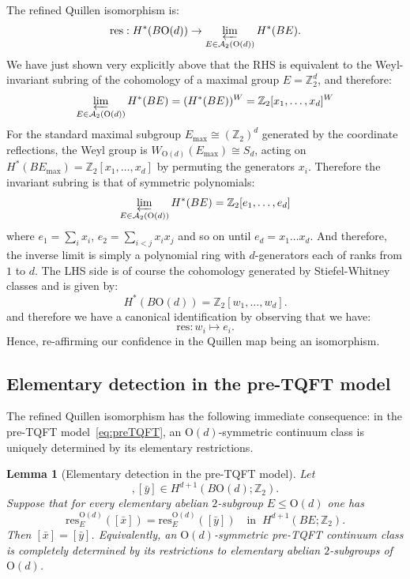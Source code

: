 \documentclass[aps,prx,reprint,superscriptaddress,twocolumn,amsmath,amssymb,amsfonts, nofootinbib]{revtex4-2}
\newcommand{\res}{\text{res}}
\theoremstyle{apsstyle}
\newtheorem{lemma}{Lemma}
\begin{document}
\noindent The refined Quillen isomorphism is: 
\begin{equation*}
\res: H^{*}(B\mathrm{O}(d)) \to \varprojlim_{E\in \mathcal{A}_{2}(\mathrm{O}(d))} H^{*}(BE).
\end{equation*}
We have just shown very explicitly above that the RHS is equivalent to the Weyl-invariant subring of the cohomology of a maximal group $E=\mathbb{Z}_{2}^{d}$, and therefore: 
\begin{equation*}
\varprojlim_{E\in \mathcal{A}_{2}(\mathrm{O}(d))} H^{*}(BE) = (H^{*}(BE))^{W} = \mathbb{Z}_{2}[x_{1},\dots, x_{d}]^{W}
\end{equation*}
For the standard maximal subgroup $E_{\mathrm{max}}\cong(\mathbb Z_2)^d$ generated by the coordinate reflections, the Weyl group is $W_{\mathrm O(d)}(E_{\mathrm{max}})\cong S_d$, acting on $H^*(BE_{\mathrm{max}}) =\mathbb Z_2[x_1,\ldots,x_d]$ by permuting the generators $x_i$. Therefore the invariant subring is that of symmetric polynomials: $$
\varprojlim_{E\in \mathcal{A}_{2}(\mathrm{O}(d))} H^{*}(BE)  = \mathbb{Z}_{2}[e_{1},\dots, e_{d}]
$$where $e_{1}= \sum_{i}x_{i}$, $e_{2}=\sum_{i<j}x_{i}x_{j}$ and so on until $e_{d}=x_{1}\dots x_{d}$. And therefore, the inverse limit is simply a polynomial ring with $d$-generators each of ranks from $1$ to $d$.  
The LHS side is of course the cohomology generated by Stiefel-Whitney classes and is given by: $$
H^{*}(B\mathrm{O}(d)) = \mathbb{Z}_{2}[w_{1},\dots, w_{d}].
$$and therefore we have a canonical identification by observing that we have: $$\res: w_{i} \mapsto e_{i}.$$Hence, re-affirming our confidence in the Quillen map being an isomorphism.


\subsection{Elementary detection in the pre-TQFT model}
\label{app:elem_detection_pretqft}

The refined Quillen isomorphism has the following immediate consequence: in the pre-TQFT model~\eqref{eq:preTQFT}, an $\mathrm{O}(d)$-symmetric continuum class is uniquely determined by
its elementary restrictions.

\begin{lemma}[Elementary detection in the pre-TQFT model]
\label{lemma:elem_detection_pretqft}
Let
\begin{equation*}
[\bar x],[\bar y]\in H^{d+1}(B\mathrm{O}(d);\mathbb Z_2).
\end{equation*}
Suppose that for every elementary abelian $2$-subgroup $E\leq \mathrm{O}(d)
$ one has
\begin{equation*}
\res^{\mathrm{O}(d)}_{E}([\bar x])
= \res^{\mathrm{O}(d)}_{E}([\bar y])
\quad
\text{in}\;\; H^{d+1}(BE;\mathbb Z_2).
\end{equation*}
Then $[\bar x]=[\bar y]$. Equivalently, an $\mathrm{O}(d)$-symmetric pre-TQFT continuum class is completely determined by its restrictions to elementary abelian $2$-subgroups of $\mathrm{O}(d)$.
\end{lemma}
\end{document}
